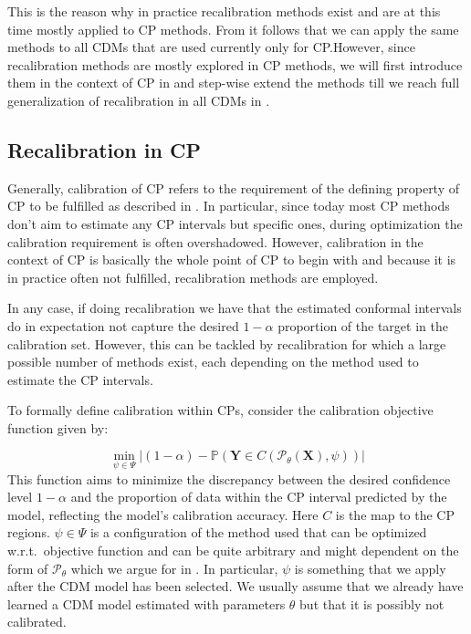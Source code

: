 This is the reason why in practice recalibration methods exist and are at this time mostly applied to CP methods. From  it follows that we can apply the same methods to all CDMs that are used currently only for CP.\@ However, since recalibration methods are mostly explored in CP methods, we will first introduce them in the context of CP in  and step-wise extend the methods till we reach full generalization of recalibration in all CDMs in .

\subsection{Recalibration in CP}\label{sec:recalibration_cp}
Generally, calibration of CP refers to the requirement of the defining property of CP to be fulfilled as described in . In particular, since today most CP methods don't aim to estimate any CP intervals but specific ones, during optimization the calibration requirement is often overshadowed. However, calibration in the context of CP is basically the whole point of CP to begin with and because it is in practice often not fulfilled, recalibration methods are employed.

In any case, if doing recalibration we have that the estimated conformal intervals do in expectation not capture the desired $1 - \alpha$ proportion of the target in the calibration set. However, this can be tackled by recalibration for which a large possible number of methods exist, each depending on the method used to estimate the CP intervals.

To formally define calibration within CPs, consider the calibration objective function given by:

\begin{equation}
    \min_{\psi \in \Psi} |(1 - \alpha) - \mathbb{P}(\mathbf{Y} \in C(\mathscr{P}_{\theta}(\mathbf{X}), \psi))|
    \label{eq:calibration_objective_formal}
\end{equation}
This function aims to minimize the discrepancy between the desired confidence level \(1 - \alpha\) and the proportion of data within the CP interval predicted by the model, reflecting the model's calibration accuracy. Here $C$ is the map to the CP regions. $\psi\in\Psi$ is a configuration of the method used that can be optimized w.r.t.\ objective function and can be quite arbitrary and might dependent on the form of $\mathscr{P}_{\theta}$ which we argue for in . In particular, $\psi$ is something that we apply after the CDM model has been selected. We usually assume that we already have learned a CDM model estimated with parameters $\theta$ but that it is possibly not calibrated.

